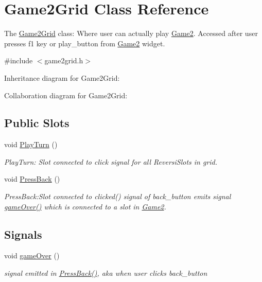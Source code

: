\hypertarget{classGame2Grid}{}\section{Game2\+Grid Class Reference}
\label{classGame2Grid}


The \hyperlink{classGame2Grid}{Game2\+Grid} class\+: Where user can actually play \hyperlink{classGame2}{Game2}. Accessed after user presses f1 key or play\+\_\+button from \hyperlink{classGame2}{Game2} widget.  




{\ttfamily \#include $<$game2grid.\+h$>$}



Inheritance diagram for Game2\+Grid\+:


Collaboration diagram for Game2\+Grid\+:
\subsection*{Public Slots}
\begin{DoxyCompactItemize}
\item 
void \hyperlink{classGame2Grid_a0b6b7e172797f39841d9cff2964777fa}{Play\+Turn} ()
\begin{DoxyCompactList}\small\item\em Play\+Turn\+: Slot connected to click signal for all Reversi\+Slots in grid. \end{DoxyCompactList}\item 
\mbox{\label{classGame2Grid_afa62f8ea4795c6826402c53110c6ba49}} 
void \hyperlink{classGame2Grid_afa62f8ea4795c6826402c53110c6ba49}{Press\+Back} ()
\begin{DoxyCompactList}\small\item\em Press\+Back\+:Slot connected to clicked() signal of back\+\_\+button emits signal \hyperlink{classGame2Grid_a33f724e897b96d77eebca3525ac4e095}{game\+Over()} which is connected to a slot in \hyperlink{classGame2}{Game2}. \end{DoxyCompactList}\end{DoxyCompactItemize}
\subsection*{Signals}
\begin{DoxyCompactItemize}
\item 
\mbox{\label{classGame2Grid_a33f724e897b96d77eebca3525ac4e095}} 
void \hyperlink{classGame2Grid_a33f724e897b96d77eebca3525ac4e095}{game\+Over} ()
\begin{DoxyCompactList}\small\item\em signal emitted in \hyperlink{classGame2Grid_afa62f8ea4795c6826402c53110c6ba49}{Press\+Back()}, aka when user clicks back\+\_\+button \end{DoxyCompactList}\end{DoxyCompactItemize}
